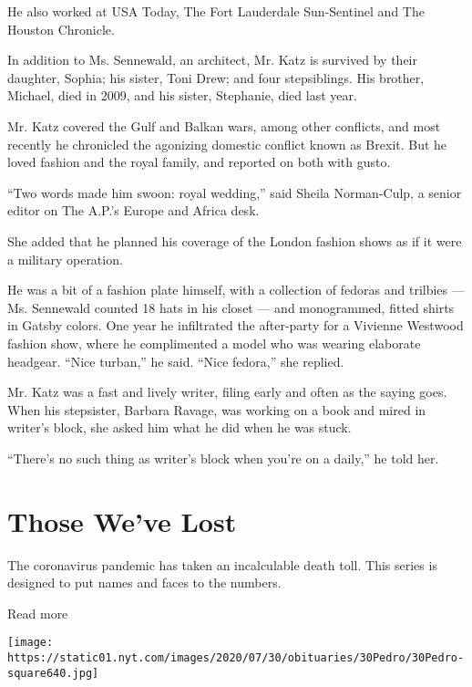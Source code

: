 He also worked at USA Today, The Fort Lauderdale Sun-Sentinel and The
Houston Chronicle.

In addition to Ms. Sennewald, an architect, Mr. Katz is survived by
their daughter, Sophia; his sister, Toni Drew; and four stepsiblings.
His brother, Michael, died in 2009, and his sister, Stephanie, died last
year.

Mr. Katz covered the Gulf and Balkan wars, among other conflicts, and
most recently he chronicled the agonizing domestic conflict known as
Brexit. But he loved fashion and the royal family, and reported on both
with gusto.

``Two words made him swoon: royal wedding,'' said Sheila Norman-Culp, a
senior editor on The A.P.'s Europe and Africa desk.

She added that he planned his coverage of the London fashion shows as if
it were a military operation.

He was a bit of a fashion plate himself, with a collection of fedoras
and trilbies --- Ms. Sennewald counted 18 hats in his closet --- and
monogrammed, fitted shirts in Gatsby colors. One year he infiltrated the
after-party for a Vivienne Westwood fashion show, where he complimented
a model who was wearing elaborate headgear. ``Nice turban,'' he said.
``Nice fedora,'' she replied.

Mr. Katz was a fast and lively writer, filing early and often as the
saying goes. When his stepsister, Barbara Ravage, was working on a book
and mired in writer's block, she asked him what he did when he was
stuck.

``There's no such thing as writer's block when you're on a daily,'' he
told her.

\href{https://www.nytimes.com/interactive/2020/obituaries/people-died-coronavirus-obituaries.html?action=click\&pgtype=Article\&state=default\&region=BELOW_MAIN_CONTENT\&context=covid_obits_promo}{}

\hypertarget{those-weve-lost}{%
\section{Those We've Lost}\label{those-weve-lost}}

The coronavirus pandemic has taken an incalculable death toll. This
series is designed to put names and faces to the numbers.

Read more

\texttt{[image: https://static01.nyt.com/images/2020/07/30/obituaries/30Pedro/30Pedro-square640.jpg]}

